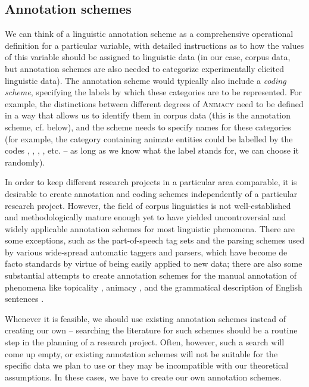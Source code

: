 \subsection{Annotation schemes}
\label{sec:annotationschemes}

We can think of a linguistic annotation  scheme as a comprehensive operational  definition for a particular variable, with detailed instructions as to how the values of this variable should be assigned to linguistic data (in our case, corpus data, but annotation  schemes are also needed to categorize  experimentally  elicited  linguistic data). The annotation scheme would typically also include a \emph{coding scheme},  specifying the labels by which these categories are to be represented. For example, the distinctions between different degrees of \textsc{Animacy}  need to be defined in a way that allows us to identify them in corpus data (this is the annotation  scheme, cf. below), and the scheme needs to specify names for these categories  (for example, the category containing animate entities could be labelled by the codes  , , , , etc. -- as long as we know what the label stands for, we can choose it randomly).

In order to keep different research projects in a particular area comparable, it is desirable to create annotation and coding  schemes independently of a particular research project. However, the field of corpus linguistics is not well\hyp{}established and methodologically mature enough yet to have yielded uncontroversial and widely applicable annotation  schemes for most linguistic phenomena. There are some exceptions, such as the part\hyp{}of\hyp{}speech tag  sets and the parsing schemes used by various wide\hyp{}spread automatic taggers and parsers, which have become de facto standards by virtue of being easily applied to new data; there are also some substantial attempts to create annotation  schemes for the manual annotation of phenomena like topicality  \citep[cf.][]{givon_topic_1983}, animacy  \citep[cf.][]{zaenen_animacy_2004}, and the grammatical description  of English sentences \citep[e.g.][]{sampson_english_1995}.

Whenever it is feasible, we should use existing annotation  schemes instead of creating our own -- searching the literature for such schemes should be a routine step in the planning of a research project. Often, however, such a search will come up empty, or existing annotation schemes will not be suitable for the specific data we plan to use or they may be incompatible with our theoretical assumptions. In these cases, we have to create our own annotation  schemes.

